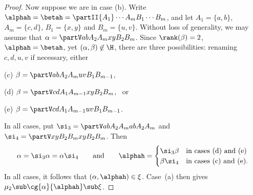 \begin{proof}
Now suppose we are in case (b).  Write $\alphah=\betah=\partII{A_1}\cdots{A_m}{B_1}\cdots{B_m}$, and let $A_1=\{a,b\}$, $A_m=\{c,d\}$, $B_1=\{x,y\}$ and $B_m=\{u,v\}$.  Without loss of generality, we may assume that $\alpha=\partV ab{A_2}{A_m}xy{B_2}{B_m}$.  Since $\rank(\beta)=2$, $\alphah=\betah$, yet $(\alpha,\beta)\not\in{\H}$, there are three possibilities: renaming $c,d,u,v$ if necessary, either
\begin{itemize}\begin{multicols}{3}
\item[(c)] $\beta=\partV ab{A_2}{A_m}uv{B_1}{B_{m-1}}$,
\item[(d)] $\beta=\partV cd{A_1}{A_{m-1}}xy{B_2}{B_m}$, \ or
\item[(e)] $\beta=\partV cd{A_1}{A_{m-1}}uv{B_1}{B_{m-1}}$.
\end{multicols}\end{itemize}
In all cases, put $\si_3=\partV ab{A_2}{A_m}ab{A_2}{A_m}$ and $\si_4=\partV xy{B_2}{B_m}xy{B_2}{B_m}$.  Then
\[
\alpha=\si_3\alpha=\alpha\si_4
\qquad\text{and}\qquad
\alphah=\begin{cases}
\si_3\beta &\text{in cases (d) and (e)}\\
\beta\si_4 &\text{in cases (c) and (e).}
\end{cases}
\]
In all cases, it follows that $(\alpha,\alphah)\in \xi$.
Case~(a) then gives $\mu_2\sub\cg{\alpha}{\alphah}\sub\xi$.


\end{proof}
